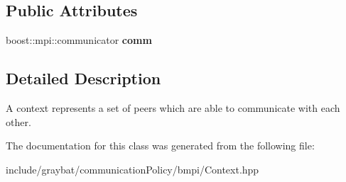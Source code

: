 \subsection*{Public Attributes}
\begin{DoxyCompactItemize}
\item 
\hypertarget{classgraybat_1_1communicationPolicy_1_1bmpi_1_1Context_a99da94dddaf38f708f66b629b208af13}{}boost\+::mpi\+::communicator {\bfseries comm}\label{classgraybat_1_1communicationPolicy_1_1bmpi_1_1Context_a99da94dddaf38f708f66b629b208af13}

\end{DoxyCompactItemize}


\subsection{Detailed Description}
A context represents a set of peers which are able to communicate with each other. 

The documentation for this class was generated from the following file\+:\begin{DoxyCompactItemize}
\item 
include/graybat/communication\+Policy/bmpi/Context.\+hpp\end{DoxyCompactItemize}
